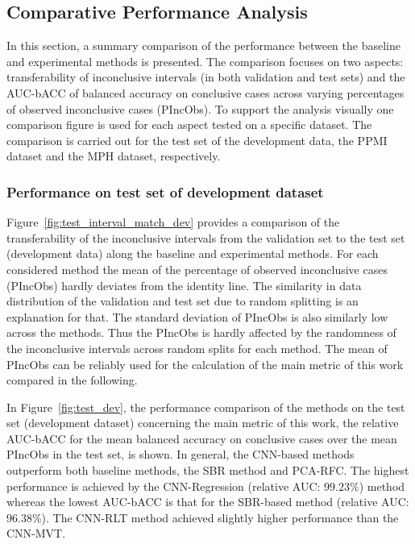 \subsection{Comparative Performance Analysis}
\label{subsec:compar_anal}

In this section, a summary comparison of the performance between the baseline and experimental methods is presented.
The comparison focuses on two aspects: transferability of inconclusive intervals (in both validation and test sets) 
and the AUC-bACC of balanced accuracy on conclusive cases across varying percentages of observed inconclusive cases (PIncObs).
To support the analysis visually one comparison figure is used for each aspect tested on a specific dataset.
The comparison is carried out for the test set of the development data, 
the PPMI dataset and the MPH dataset, respectively.

\subsubsection{Performance on test set of development dataset}

Figure~\ref{fig:test_interval_match_dev} provides a comparison of the transferability of the inconclusive intervals 
from the validation set to the test set (development data) along the baseline and experimental methods.
For each considered method the mean of the percentage of observed inconclusive cases (PIncObs) 
hardly deviates from the identity line.
The similarity in data distribution of the validation and test set due to random splitting is an explanation for that.
The standard deviation of PIncObs is also similarly low across the methods.
Thus the PIncObs is hardly affected by the randomness of the inconclusive intervals across random splits for each method.
The mean of PIncObs can be reliably used for the calculation of the main metric of this work compared in the following.

In Figure~\ref{fig:test_dev}, the performance comparison of the methods on the test set (development dataset) 
concerning the main metric of this work, 
the relative AUC-bACC for the mean balanced accuracy on conclusive cases
over the mean PIncObs in the test set, is shown.
In general, the CNN-based methods outperform both baseline methods, the SBR method and PCA-RFC.
The highest performance is achieved by the CNN-Regression (relative AUC: $99.23\%$) method 
whereas the lowest AUC-bACC is that for the SBR-based method (relative AUC: $96.38\%$).
The CNN-RLT method achieved slightly higher performance than the CNN-MVT.


